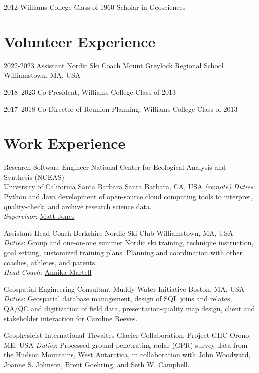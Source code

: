 \documentclass[a4paper,12pt,sans,colorlinks]{moderncv}
\newcommand{\seth}{\href{https://www.alpinesciences.net}{Seth W. Campbell}}
\newcommand{\mattjones}{\href{https://orcid.org/0000-0003-0077-4738}{Matt Jones}}
\newcommand{\johnwoodward}{\href{https://www.northumbria.ac.uk/about-us/our-staff/w/john-woodward}{John Woodward}}
\newcommand{\joannejohnson}{\href{https://www.bas.ac.uk/profile/jsj/}{Joanne S. Johnson}}
\newcommand{\brent}{\href{https://sse.tulane.edu/eens/faculty/goehring}{Brent Goehring}}
\newcommand{\caroline}{\href{https://www.muddywaterinitiative.org/leadership}{Caroline Reeves}}
\newcommand{\annika}{\href{https://ephsports.williams.edu/sports/mens-skiing/roster/coaches/annika-martell/525}{Annika Martell}}
\begin{document}
\cvline
{2012}
{Williams College Class of 1960 Scholar in Geosciences}


\section{Volunteer Experience}

{2022-2023}
{Assistant Nordic Ski Coach}
{Mount Greylock Regional School}
{Williamstown, MA, USA}

\cvline
{2018--2023}
{Co-President, Williams College Class of 2013}

\cvline
{2017--2018}
{Co-Director of Reunion Planning, Williams College Class of 2013}

\section{Work Experience}

{Research Software Engineer}
{National Center for Ecological Analysis and Synthesis (NCEAS)
\\
University of California Santa Barbara}
{Santa Barbara, CA, USA \emph{(remote)}}
{}
{
    \emph{Duties}: Python and Java development of open-source cloud computing
    tools to interpret, quality-check, and archive research science data.
    \\
    \emph{Supervisor}: \mattjones
}

{Assistant Head Coach}
{Berkshire Nordic Ski Club}
{Williamstown, MA, USA}
{}
{
    \emph{Duties}: Group and one-on-one summer Nordic ski training, technique instruction, goal setting, customized training
    plans. Planning and coordination with other coaches, athletes, and parents.
    \\
    \emph{Head Coach:} \annika
}

{Geospatial Engineering Consultant}
{Muddy Water Initiative}
{Boston, MA, USA}
{}
{
    \emph{Duties}: Geospatial database management, design of SQL joins and
    relates, QA/QC and digitization of field data, presentation-quality map
    design, client and stakeholder interaction for \caroline.
}

{Geophysicist}
{International Thwaites Glacier Collaboration, Project GHC}
{Orono, ME, USA}
{}
{
    \emph{Duties}: Processed ground-penetrating radar (GPR) survey data
    from the Hudson Mountains, West Antarctica, in collaboration with
    \johnwoodward, \joannejohnson, \brent, and \seth.
}
\end{document}
